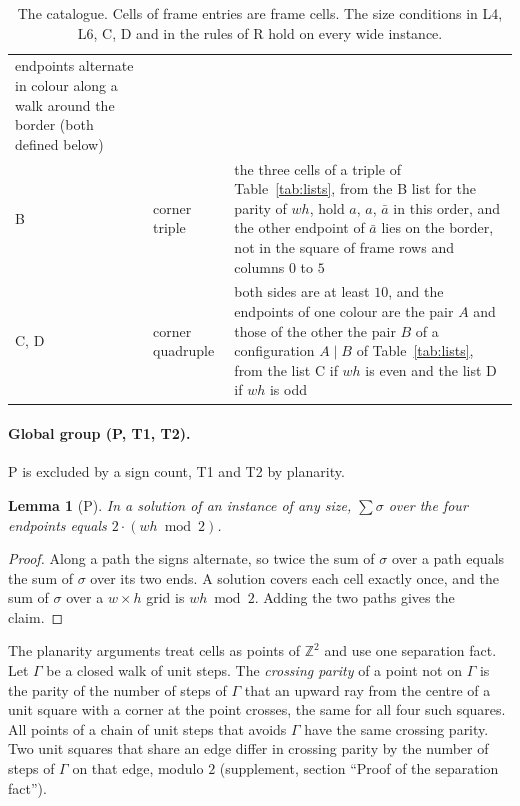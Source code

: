 \documentclass[11pt]{article}
\newtheorem{lemma}[theorem]{Lemma}
\newcommand{\ent}[1]{\textsf{#1}}
\begin{document}
\begin{table}[htbp]
\begin{tabular}{@{}l>{\raggedright\arraybackslash}p{}>{\raggedright\arraybackslash}p{}@{}}
  endpoints alternate in colour along a walk around the border (both defined below) \\
\ent{B} & corner triple & the three cells of a triple of Table~\ref{tab:lists}, from the \ent{B}
  list for the parity of $wh$, hold $a$, $a$, $\bar a$ in this order, and the other endpoint of
  $\bar a$ lies on the border, not in the square of frame rows and columns $0$ to $5$ \\
\ent{C}, \ent{D} & corner quadruple & both sides are at least $10$, and the endpoints of one
  colour are the pair $A$ and those of the other the pair $B$ of a configuration $A\mid B$ of
  Table~\ref{tab:lists}, from the list \ent{C} if $wh$ is even and the list \ent{D} if $wh$ is
  odd \\
\bottomrule
\end{tabular}
\caption{The catalogue. Cells of frame entries are frame cells. The size conditions in \ent{L4},
\ent{L6}, \ent{C}, \ent{D} and in the rules of \ent{R} hold on every wide instance.}
\label{tab:catalogue}
\end{table}

\paragraph{Global group (\ent{P}, \ent{T1}, \ent{T2}).}
\ent{P} is excluded by a sign count, \ent{T1} and \ent{T2} by planarity.

\begin{lemma}[\ent{P}]\label{lem:parity}
In a solution of an instance of any size, $\sum\sigma$ over the four endpoints equals
$2\cdot(wh\bmod 2)$.
\end{lemma}
\begin{proof}
Along a path the signs alternate, so twice the sum of $\sigma$ over a path equals the sum of
$\sigma$ over its two ends. A solution covers each cell exactly once, and the sum of $\sigma$ over
a $w\times h$ grid is $wh\bmod 2$. Adding the two paths gives the claim.
\end{proof}

The planarity arguments treat cells as points of $\mathbb{Z}^2$ and use one separation fact. Let
$\Gamma$ be a closed walk of unit steps. The \emph{crossing parity} of a point not on $\Gamma$ is
the parity of the number of steps of $\Gamma$ that an upward ray from the centre of a unit square
with a corner at the point crosses, the same for all four such squares. All points of a chain of
unit steps that avoids $\Gamma$ have the same crossing parity. Two unit squares that share an edge
differ in crossing parity by the number of steps of $\Gamma$ on that edge, modulo $2$
(supplement, section ``Proof of the separation fact'').
\end{document}
